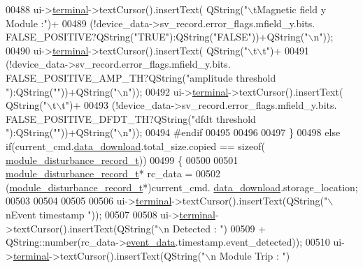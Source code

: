 \begin{DoxyCode}
00488        ui->\hyperlink{a00080_aae71c46ea4546df5994735dee573b2dd}{terminal}->textCursor().insertText( QString(\textcolor{stringliteral}{"\(\backslash\)tMagnetic field y Module :"})+
00489                                             (!device\_data->sv\_record.error\_flags.mfield\_y.bits.
      FALSE\_POSITIVE?QString(\textcolor{stringliteral}{"TRUE"}):QString(\textcolor{stringliteral}{"FALSE"}))+QString(\textcolor{stringliteral}{"\(\backslash\)n"}));
00490        ui->\hyperlink{a00080_aae71c46ea4546df5994735dee573b2dd}{terminal}->textCursor().insertText( QString(\textcolor{stringliteral}{"\(\backslash\)t\(\backslash\)t"})+
00491                                             (!device\_data->sv\_record.error\_flags.mfield\_y.bits.
      FALSE\_POSITIVE\_AMP\_TH?QString(\textcolor{stringliteral}{"amplitude threshold "}):QString(\textcolor{stringliteral}{""}))+QString(\textcolor{stringliteral}{"\(\backslash\)n"}));
00492        ui->\hyperlink{a00080_aae71c46ea4546df5994735dee573b2dd}{terminal}->textCursor().insertText( QString(\textcolor{stringliteral}{"\(\backslash\)t\(\backslash\)t"})+
00493                                             (!device\_data->sv\_record.error\_flags.mfield\_y.bits.
      FALSE\_POSITIVE\_DFDT\_TH?QString(\textcolor{stringliteral}{"dfdt threshold "}):QString(\textcolor{stringliteral}{""}))+QString(\textcolor{stringliteral}{"\(\backslash\)n"}));
00494 \textcolor{preprocessor}{#endif}
00495 
00496 
00497     \}
00498     \textcolor{keywordflow}{else} \textcolor{keywordflow}{if}(current\_cmd.\hyperlink{a00004_a5cfeaed4d4f8e51070a324c0ba893ebe}{data\_download}.total\_size.copied == \textcolor{keyword}{sizeof}(
      \hyperlink{a00019}{module\_disturbance\_record\_t}))
00499     \{
00500         
00501         \hyperlink{a00019}{module\_disturbance\_record\_t}* rc\_data = 
00502                 (\hyperlink{a00019}{module\_disturbance\_record\_t}*)current\_cmd.
      \hyperlink{a00004_a5cfeaed4d4f8e51070a324c0ba893ebe}{data\_download}.storage\_location;
00503 
00504 
00505 
00506         ui->\hyperlink{a00080_aae71c46ea4546df5994735dee573b2dd}{terminal}->textCursor().insertText(QString(\textcolor{stringliteral}{"\(\backslash\)nEvent timestamp "}));
00507 
00508         ui->\hyperlink{a00080_aae71c46ea4546df5994735dee573b2dd}{terminal}->textCursor().insertText(QString(\textcolor{stringliteral}{"\(\backslash\)n      Detected   : "})
00509                            + QString::number(rc\_data->\hyperlink{a00019_a5a700ec4c240f4e86c5fb61aef8d983e}{event\_data}.timestamp.event\_detected));
00510         ui->\hyperlink{a00080_aae71c46ea4546df5994735dee573b2dd}{terminal}->textCursor().insertText(QString(\textcolor{stringliteral}{"\(\backslash\)n      Module Trip  : "})

\end{DoxyCode}
